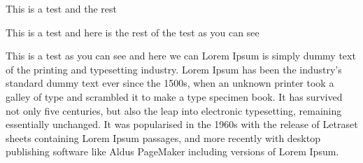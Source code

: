 \documentclass{article}
\begin{document}
This is a test  and the rest

\bigskip


This is a test  and here is the rest of the test as you can see

This is a test as you can see and here we can  Lorem Ipsum is simply dummy text of the printing and typesetting industry. Lorem Ipsum has been the industry's standard dummy text ever since the 1500s, when an unknown printer took a galley of type and scrambled it to make a type specimen book. It has survived not only five centuries, but also the leap into electronic typesetting, remaining essentially unchanged. It was popularised in the 1960s with the release of Letraset sheets containing Lorem Ipsum passages, and more recently with desktop publishing software like Aldus PageMaker including versions of Lorem Ipsum.
\end{document}
